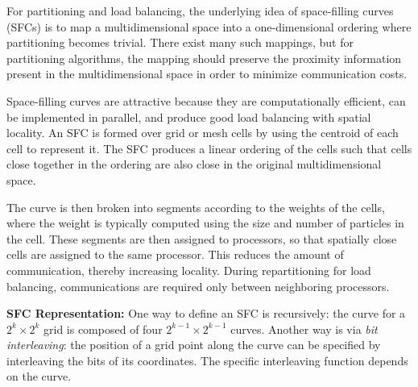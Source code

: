 \documentclass[12pt]{book}
\begin{document}
For partitioning and load balancing, the underlying idea of space-filling curves (SFCs) is to map a multidimensional space into a one-dimensional ordering where partitioning becomes trivial. There exist many such mappings, but for partitioning algorithms, the mapping should preserve the proximity information present in the multidimensional space in order to minimize communication costs. 

Space-filling curves are attractive because they are computationally efficient, can be implemented in parallel, and produce good load balancing with spatial locality. An SFC is formed over grid or mesh cells by using the centroid of each cell to represent it. The SFC produces a linear ordering of the cells such that cells close together in the ordering are also close in the original multidimensional space. 

The curve is then broken into segments according to the weights of the cells, where the weight is typically computed using the size and number of particles in the cell. These segments are then assigned to processors, so that spatially close cells are assigned to the same processor. This reduces the amount of communication, thereby increasing locality. During repartitioning for load balancing, communications are required only between neighboring processors.

\textbf{SFC Representation:} 
One way to define an SFC is recursively: the curve for a $2^k \times 2^k$ grid is composed of four $2^{k-1} \times 2^{k-1}$ curves. Another way is via \emph{bit interleaving}: the position of a grid point along the curve can be specified by interleaving the bits of its coordinates. The specific interleaving function depends on the curve. 
\end{document}
